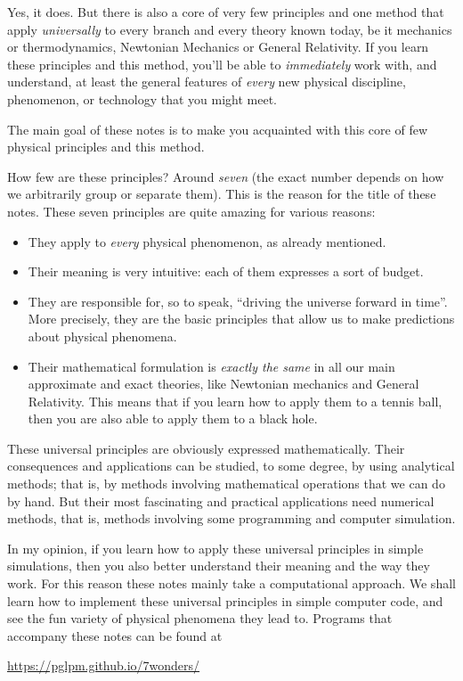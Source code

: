 \documentclass[a4paper,12pt,%
onecolumn,oneside,%
british%
]{memoir}
\renewcommand*{\|}[1][]{\nonscript\:#1\vert\nonscript\:\mathopen{}}
\begin{document}
Yes, it does. But there is also a core of very few principles and one method that apply \emph{universally} to every branch and every theory known today, be it mechanics or thermodynamics, Newtonian Mechanics or General Relativity. If you learn these principles and this method, you'll be able to \emph{immediately} work with, and understand, at least the general features of \emph{every} new physical discipline, phenomenon, or technology that you might meet.

\medskip

The main goal of these notes is to make you acquainted with this core of few physical principles and this method.

How few are these principles? Around \emph{seven} (the exact number depends on how we arbitrarily group or separate them). This is the reason for the title of these notes. These seven principles are quite amazing for various reasons:
\begin{itemize}
\item They apply to \emph{every} physical phenomenon, as already mentioned.
\item Their meaning is very intuitive: each of them expresses a sort of budget.
\item They are responsible for, so to speak, \enquote{driving the universe forward in time}. More precisely, they are the basic principles that allow us to make predictions about physical phenomena.
\item Their mathematical formulation is \emph{exactly the same} in all our main approximate and exact theories, like Newtonian mechanics and General Relativity. This means that if you learn how to apply them to a tennis ball, then you are also able to apply them to a black hole.
\end{itemize}

\medskip

These universal principles are obviously expressed mathematically. Their consequences and applications can be studied, to some degree, by using analytical methods; that is, by methods involving mathematical operations that we can do by hand. But their most fascinating and practical applications need numerical methods, that is, methods involving some programming and computer simulation.

In my opinion, if you learn how to apply these universal principles in simple simulations, then you also better understand their meaning and the way they work. For this reason these notes mainly take a computational approach. We shall learn how to implement these universal principles in simple computer code, and see the fun variety of physical phenomena they lead to. Programs that accompany these notes can be found at
\begin{center}
  \url{https://pglpm.github.io/7wonders/}
\end{center}
\end{document}
